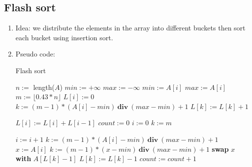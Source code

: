 \documentclass[12pt]{article}
\begin{document}
    \subsection{Flash sort}
    \begin{enumerate}
        \item Idea: we distribute the elements in the array into different buckets then sort each bucket using insertion sort.
        \item Pseudo code:
        \begin{algorithm}[H]
            \caption{Flash sort}
            \begin{algorithmic}[1]
                    \State $n:=$ length($A$)
                    \State $\textit{min}:=+\infty$
                    \State $\textit{max}:=-\infty$
                            \State $\textit{min}:=A[i]$
                        \EndIf
                            \State $\textit{max}:=A[i]$
                        \EndIf
                    \EndFor 
                    \State $m:=\lfloor 0.43*n\rfloor$
                        \State $L[i]:=0$
                    \EndFor
                        \State $k:=(m-1)*(A[i]-\textit{min})\ \textbf{div}\ (\textit{max}-\textit{min})+1$
                        \State $L[k]:=L[k]+1$
                    \EndFor
            \end{algorithmic}
        \end{algorithm}
        
        \begin{algorithm}[H]
            \begin{algorithmic}[1]
                        \State $L[i]:=L[i]+L[i-1]$
                    \EndFor
                    \State $\textit{count}:=0$
                    \State $i:=0$
                    \State $k:=m$
                    
                            \State $i:=i+1$
                            \State $k:=(m-1)*(A[i]-\textit{min})\ \textbf{div}\ (\textit{max}-\textit{min})+1$
                        \EndWhile
                        \State $x:=A[i]$
                            \State $k:=(m-1)*(x-\textit{min})\ \textbf{div}\ (\textit{max}-\textit{min})+1$
                            \State \textbf{swap} $x$ \textbf{with} $A[L[k]-1]$
                            \State $L[k]:=L[k]-1$
                            \State $\textit{count}:=\textit{count}+1$
                        \EndWhile
                    \EndWhile


\end{algorithmic}
\end{algorithm}
\end{enumerate}
\end{document}
